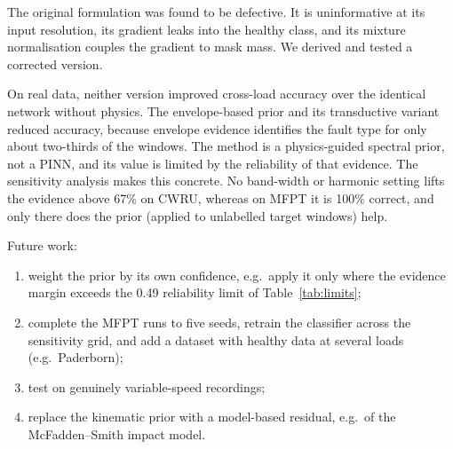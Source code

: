 \documentclass[conference]{IEEEtran}
\begin{document}
The original formulation was found to be defective. It is uninformative at its
input resolution, its gradient leaks into the healthy class, and its mixture
normalisation couples the gradient to mask mass. We derived and tested a
corrected version.

On real data, neither version improved cross-load accuracy over the identical
network without physics. The envelope-based prior and its transductive variant
reduced accuracy, because envelope evidence identifies the fault type for only
about two-thirds of the windows. The method is a physics-guided spectral prior,
not a PINN, and its value is limited by the reliability of that evidence.
The sensitivity analysis makes this concrete. No band-width or harmonic
setting lifts the evidence above 67\% on CWRU, whereas on MFPT it is 100\%
correct, and only there does the prior (applied to unlabelled target windows)
help.

Future work:
\begin{enumerate}
\item weight the prior by its own confidence, e.g.\ apply it only where the
evidence margin exceeds the 0.49 reliability limit of Table~\ref{tab:limits};
\item complete the MFPT runs to five seeds, retrain the classifier across the
sensitivity grid, and add a dataset with healthy data at several loads
(e.g.\ Paderborn);
\item test on genuinely variable-speed recordings;
\item replace the kinematic prior with a model-based residual, e.g.\ of the
McFadden--Smith impact model.
\end{enumerate}

\end{document}
